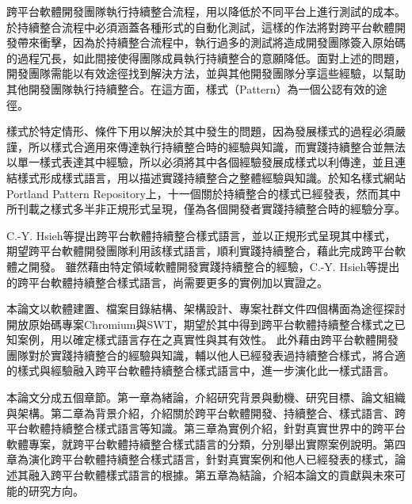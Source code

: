 跨平台軟體開發團隊執行持續整合流程，用以降低於不同平台上進行測試的成本。於持續整合流程中必須涵蓋各種形式的自動化測試，這樣的作法將對跨平台軟體開發帶來衝擊，因為於持續整合流程中，執行過多的測試將造成開發團隊簽入原始碼的過程冗長，如此間接使得團隊成員執行持續整合的意願降低\cite{teampace}。面對上述的問題，開發團隊需能以有效途徑找到解決方法，並與其他開發團隊分享這些經驗，以幫助其他開發團隊執行持續整合。在這方面，樣式（Pattern）為一個公認有效的途徑。

樣式於特定情形、條件下用以解決於其中發生的問題，因為發展樣式的過程必須嚴謹，所以樣式合適用來傳達執行持續整合時的經驗與知識，而實踐持續整合並無法以單一樣式表達其中經驗，所以必須將其中各個經驗發展成樣式以利傳達，並且連結樣式形成樣式語言，用以描述實踐持續整合之整體經驗與知識。於知名樣式網站Portland Pattern Repository\cite{portlandcipatterns}上，十一個關於持續整合的樣式已經發表，然而其中所刊載之樣式多半非正規形式呈現，僅為各個開發者實踐持續整合時的經驗分享。

C.-Y. Hsieh等提出跨平台軟體持續整合樣式語言\cite{crossplatformcipatterns}，並以正規形式呈現其中樣式，期望跨平台軟體開發團隊利用該樣式語言，順利實踐持續整合，藉此完成跨平台軟體之開發。 雖然藉由特定領域軟體開發實踐持續整合的經驗，C.-Y. Hsieh等提出的跨平台軟體持續整合樣式語言，尚需要更多的實例加以實證之。

本論文以軟體建置、檔案目錄結構、架構設計、專案社群文件四個構面為途徑探討開放原始碼專案Chromium與SWT，期望於其中得到跨平台軟體持續整合樣式之已知案例，用以確定樣式語言存在之真實性與其有效性。 此外藉由跨平台軟體開發團隊對於實踐持續整合的經驗與知識，輔以他人已經發表過持續整合樣式，將合適的樣式與經驗融入跨平台軟體持續整合樣式語言中，進一步演化此一樣式語言。

本論文分成五個章節。第一章為緒論，介紹研究背景與動機、研究目標、論文組織與架構。第二章為背景介紹，介紹關於跨平台軟體開發、持續整合、樣式語言、跨平台軟體持續整合樣式語言等知識。第三章為實例介紹，針對真實世界中的跨平台軟體專案，就跨平台軟體持續整合樣式語言的分類，分別舉出實際案例說明。第四章為演化跨平台軟體持續整合樣式語言，針對真實案例和他人已經發表的樣式，論述其融入跨平台軟體樣式語言的根據。第五章為結論，介紹本論文的貢獻與未來可能的研究方向。


